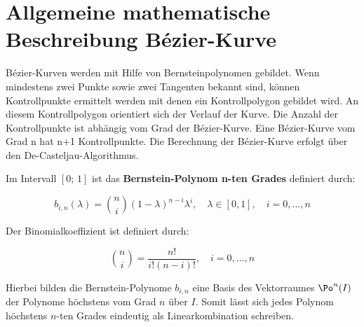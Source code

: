 %
%

\section{Allgemeine mathematische Beschreibung Bézier-Kurve}

Bézier-Kurven werden mit Hilfe von Bernsteinpolynomen gebildet. Wenn mindestens zwei Punkte sowie zwei Tangenten bekannt sind, können Kontrollpunkte ermittelt werden mit denen ein Kontrollpolygon gebildet wird. An diesem Kontrollpolygon  orientiert sich der Verlauf der Kurve. Die Anzahl der  Kontrollpunkte ist abhängig vom Grad der Bézier-Kurve.  Eine Bézier-Kurve vom Grad n hat n+1 Kontrollpunkte.  Die Berechnung der Bézier-Kurve erfolgt über den De-Casteljau-Algorithmus.

\bigskip

\DEF
{
  Im Intervall $[0;\, 1]$ ist das \textbf{ Bernstein-Polynom n-ten Grades}	definiert durch:
	
  \begin{equation}
	b_{i,n}(\lambda) = \binom{n}{i} (1-\lambda)^{n-i} \lambda^{i}, \quad \lambda \in [0,1], \quad i=0,\dots,n
	\label{Bernsteinpolynome}
  \end{equation}
}

\bigskip

\DEF
{
  Der Binomialkoeffizient ist definiert durch:
    
 \begin{equation}
   \binom{n}{i}=\frac{n!}{i!(n-i)!}, \quad i=0, \dots ,n  
   \label{Binomialkoeffizient}
 \end{equation}
}	

\bigskip

Hierbei bilden die Bernstein-Polynome $b_{i,n}$ eine Basis des Vektorraumes $\Po^n(I)$ der Polynome höchstens vom Grad $n$ über $I$. Somit lässt sich jedes Polynom höchstens $n$-ten Grades eindeutig als Linearkombination schreiben.	%
\cite{Farin:2002}

\bigskip



